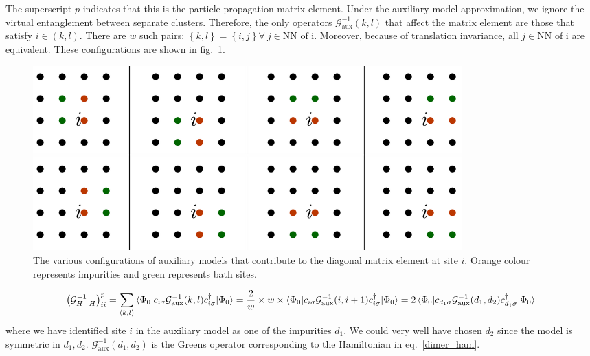 \documentclass[10pt]{report}
\numberwithin{equation}{section}
\begin{document}
The superscript \(p\) indicates that this is the particle propagation matrix element. Under the auxiliary model approximation, we ignore the virtual entanglement between separate clusters. Therefore, the only operators \(\mathcal{G}^{-1}_\text{aux}(k,l)\) that affect the matrix element are those that satisfy \(i \in \left(k,l\right)\). There are \(w\) such pairs: \(\left\{k,l\right\} = \left\{i,j\right\} \forall~ j \in \text{NN of i}\). Moreover, because of translation invariance, all \(j \in \text{NN of i}\) are equivalent. These configurations are shown in fig.~\ref{diag_conrib}.
\begin{figure}[!htb]
	\centering
	\includegraphics[width=0.8\textwidth]{../figures/diagonal_contributors.pdf}
	\caption{The various configurations of auxiliary models that contribute to the diagonal matrix element at site \(i\). Orange colour represents impurities and green represents bath sites.}
	\label{diag_conrib}
\end{figure}

\begin{equation}\begin{aligned}
	\left(\mathcal{G}^{-1}_{H-H}\right)^p_{ii} = \sum_{\left<k,l\right>} \braket{\Phi_0 | c_{i\sigma} \mathcal{G}^{-1}_\text{aux}(k,l) c^\dagger_{i\sigma} | \Phi_0} = \frac{2}{w} \times w \times \braket{\Phi_0 | c_{i\sigma} \mathcal{G}^{-1}_\text{aux}(i, i+1) c^\dagger_{i\sigma} | \Phi_0} = 2\braket{\Phi_0 | c_{d_1\sigma} \mathcal{G}^{-1}_\text{aux}(d_1,d_2) c^\dagger_{d_1\sigma} | \Phi_0}
\end{aligned}\end{equation}
where we have identified site \(i\) in the auxiliary model as one of the impurities \(d_1\). We could very well have chosen \(d_2\) since the model is symmetric in \(d_1,d_2\). \(\mathcal{G}^{-1}_\text{aux}(d_1,d_2)\) is the Greens operator corresponding to the Hamiltonian in eq.~\ref{dimer_ham}.
\end{document}
